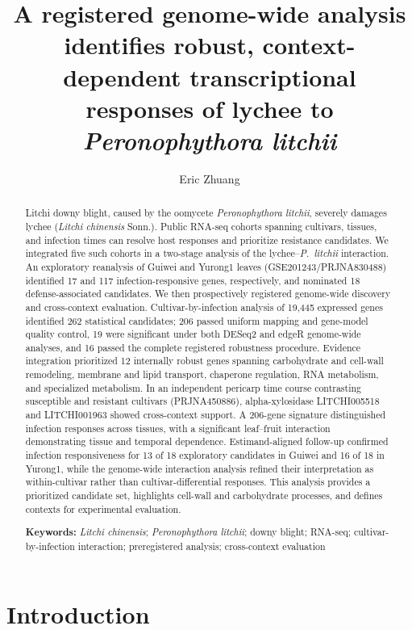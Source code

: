 \documentclass[11pt]{article}
\title{\bfseries A registered genome-wide analysis identifies robust, context-dependent transcriptional responses of lychee to \textit{Peronophythora litchii}}
\author{Eric Zhuang}
\date{}
\newcommand{\Pl}{\textit{P.~litchii}}
\begin{document}
\maketitle

\begin{abstract}
\noindent
Litchi downy blight, caused by the oomycete \textit{Peronophythora litchii}, severely damages lychee (\textit{Litchi chinensis} Sonn.). Public RNA-seq cohorts spanning cultivars, tissues, and infection times can resolve host responses and prioritize resistance candidates. We integrated five such cohorts in a two-stage analysis of the lychee--\Pl{} interaction. An exploratory reanalysis of Guiwei and Yurong1 leaves (GSE201243/PRJNA830488) identified 17 and 117 infection-responsive genes, respectively, and nominated 18 defense-associated candidates. We then prospectively registered genome-wide discovery and cross-context evaluation. Cultivar-by-infection analysis of 19,445 expressed genes identified 262 statistical candidates; 206 passed uniform mapping and gene-model quality control, 19 were significant under both DESeq2 and edgeR genome-wide analyses, and 16 passed the complete registered robustness procedure. Evidence integration prioritized 12 internally robust genes spanning carbohydrate and cell-wall remodeling, membrane and lipid transport, chaperone regulation, RNA metabolism, and specialized metabolism. In an independent pericarp time course contrasting susceptible and resistant cultivars (PRJNA450886), alpha-xylosidase LITCHI005518 and LITCHI001963 showed cross-context support. A 206-gene signature distinguished infection responses across tissues, with a significant leaf--fruit interaction demonstrating tissue and temporal dependence. Estimand-aligned follow-up confirmed infection responsiveness for 13 of 18 exploratory candidates in Guiwei and 16 of 18 in Yurong1, while the genome-wide interaction analysis refined their interpretation as within-cultivar rather than cultivar-differential responses. This analysis provides a prioritized candidate set, highlights cell-wall and carbohydrate processes, and defines contexts for experimental evaluation.

\vspace{0.6em}
\noindent\textbf{Keywords:} \textit{Litchi chinensis}; \textit{Peronophythora litchii}; downy blight; RNA-seq; cultivar-by-infection interaction; preregistered analysis; cross-context evaluation
\end{abstract}

\section{Introduction}
\end{document}
